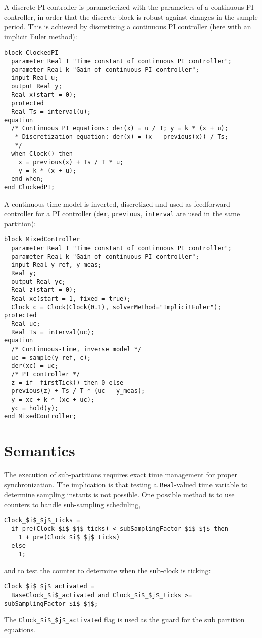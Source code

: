\begin{example}
A discrete PI controller is parameterized with the parameters of a continuous PI controller, in order that the discrete block is robust against changes in the sample period.
This is achieved by discretizing a continuous PI controller (here with an implicit Euler method):
\begin{lstlisting}[language=modelica]
block ClockedPI
  parameter Real T "Time constant of continuous PI controller";
  parameter Real k "Gain of continuous PI controller";
  input Real u;
  output Real y;
  Real x(start = 0);
  protected
  Real Ts = interval(u);
equation
  /* Continuous PI equations: der(x) = u / T; y = k * (x + u);
   * Discretization equation: der(x) = (x - previous(x)) / Ts;
   */
  when Clock() then
    x = previous(x) + Ts / T * u;
    y = k * (x + u);
  end when;
end ClockedPI;
\end{lstlisting}
A continuous-time model is inverted, discretized and used as feedforward controller for a PI controller (\lstinline!der!, \lstinline!previous!, \lstinline!interval! are used in the same partition):
\begin{lstlisting}[language=modelica]
block MixedController
  parameter Real T "Time constant of continuous PI controller";
  parameter Real k "Gain of continuous PI controller";
  input Real y_ref, y_meas;
  Real y;
  output Real yc;
  Real z(start = 0);
  Real xc(start = 1, fixed = true);
  Clock c = Clock(Clock(0.1), solverMethod="ImplicitEuler");
protected
  Real uc;
  Real Ts = interval(uc);
equation
  /* Continuous-time, inverse model */
  uc = sample(y_ref, c);
  der(xc) = uc;
  /* PI controller */
  z = if  firstTick() then 0 else
  previous(z) + Ts / T * (uc - y_meas);
  y = xc + k * (xc + uc);
  yc = hold(y);
end MixedController;
\end{lstlisting}
\end{example}

\section{Semantics}\label{semantics}

The execution of sub-partitions requires exact time management for proper synchronization.
The implication is that testing a \lstinline!Real!-valued time variable to determine sampling instants is not possible.
One possible method is to use counters to handle sub-sampling scheduling,
\begin{lstlisting}[language=modelica]
Clock_$i$_$j$_ticks =
  if pre(Clock_$i$_$j$_ticks) < subSamplingFactor_$i$_$j$ then
    1 + pre(Clock_$i$_$j$_ticks)
  else
    1;
\end{lstlisting}
and to test the counter to determine when the sub-clock is ticking:
\begin{lstlisting}[language=modelica]
Clock_$i$_$j$_activated =
  BaseClock_$i$_activated and Clock_$i$_$j$_ticks >= subSamplingFactor_$i$_$j$;
\end{lstlisting}
The \lstinline!Clock_$i$_$j$_activated! flag is used as the guard for the sub partition equations.

